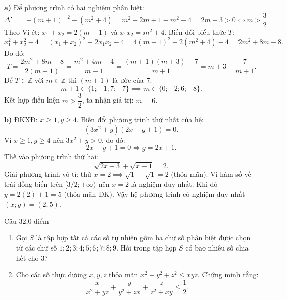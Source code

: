 \begin{loi_giai_cau}
\textbf{a)} Để phương trình có hai nghiệm phân biệt:
\[\Delta' = [-(m+1)]^2 - (m^2+4) = m^2 + 2m + 1 - m^2 - 4 = 2m - 3 > 0 \iff m > \frac{3}{2}.\]
Theo Vi-ét: $x_1+x_2 = 2(m+1)$ và $x_1 x_2 = m^2+4$.
Biến đổi biểu thức $T$:
\[x_1^2 + x_2^2 - 4 = (x_1+x_2)^2 - 2x_1 x_2 - 4 = 4(m+1)^2 - 2(m^2+4) - 4 = 2m^2 + 8m - 8.\]
Do đó:
\[T = \frac{2m^2 + 8m - 8}{2(m+1)} = \frac{m^2 + 4m - 4}{m+1} = \frac{(m+1)(m+3) - 7}{m+1} = m + 3 - \frac{7}{m+1}.\]
Để $T \in \mathbb{Z}$ với $m \in \mathbb{Z}$ thì $(m+1)$ là ước của 7:
\[m + 1 \in \{1; -1; 7; -7\} \implies m \in \{0; -2; 6; -8\}.\]
Kết hợp điều kiện $m > \dfrac{3}{2}$, ta nhận giá trị: $\boxed{m = 6}$.

\textbf{b)} ĐKXĐ: $x \ge 1, y \ge 4$.
Biến đổi phương trình thứ nhất của hệ:
\[(3x^2 + y)(2x - y + 1) = 0.\]
Vì $x \ge 1, y \ge 4$ nên $3x^2 + y > 0$, do đó:
\[2x - y + 1 = 0 \iff y = 2x + 1.\]
Thế vào phương trình thứ hai:
\[\sqrt{2x-3} + \sqrt{x-1} = 2.\]
Giải phương trình vô tỉ: thử $x = 2 \implies \sqrt{1} + \sqrt{1} = 2$ (thỏa mãn).
Vì hàm số vế trái đồng biến trên $[3/2; +\infty)$ nên $x = 2$ là nghiệm duy nhất.
Khi đó $y = 2(2) + 1 = 5$ (thỏa mãn ĐK).
Vậy hệ phương trình có nghiệm duy nhất $\boxed{(x; y) = (2; 5)}$.
\end{loi_giai_cau}

\begin{de_cau}{Câu 3}{2,0 điểm}
\begin{enumerate}[label=\alph*)]
\item Gọi $S$ là tập hợp tất cả các số tự nhiên gồm ba chữ số phân biệt được chọn từ các chữ số $1; 2; 3; 4; 5; 6; 7; 8; 9$. Hỏi trong tập hợp $S$ có bao nhiêu số chia hết cho 3?
\item Cho các số thực dương $x, y, z$ thỏa mãn $x^2 + y^2 + z^2 \le xyz$. Chứng minh rằng:
\[\dfrac{x}{x^2+yz} + \dfrac{y}{y^2+zx} + \dfrac{z}{z^2+xy} \le \dfrac{1}{2}.\]
\end{enumerate}
\end{de_cau}

